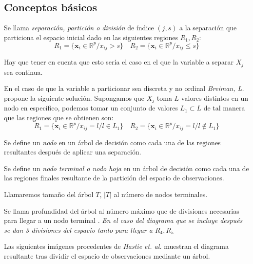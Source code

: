 \subsection*{Conceptos básicos}

\begin{defi}
Se llama \emph{separación, partición o división} de índice $(j,s)$ \cite{Hastie 2001} a la separación que particiona el espacio inicial dado en las siguientes regiones $R_1,R_2$:
\begin{equation}
R_1=\lbrace \mathbf{x}_i \in \mathbb{R}^p/ x_{ij}>s\rbrace \quad R_2=\lbrace \mathbf{x}_i \in \mathbb{R}^p/ x_{ij}\leq s\rbrace
\end{equation}

\noindent Hay que tener en cuenta que esto sería el caso en el que la variable a separar $X_j$ sea continua.

\noindent En el caso de que la variable a particionar sea discreta y no ordinal \emph{Breiman, L.}\cite{Breiman 1984} propone la siguiente solución. Supongamos que $X_j$ toma $L$ valores distintos en un nodo en específico, podemos tomar un conjunto de valores $L_1\subset L$ de tal manera que las regiones que se obtienen son:
\begin{equation}
R_1=\lbrace \mathbf{x}_i \in \mathbb{R}^p/ x_{ij}=l/ l\in L_1\rbrace \quad R_2=\lbrace \mathbf{x}_i \in \mathbb{R}^p/ x_{ij}=l/ l\notin L_1\rbrace
\end{equation}
\end{defi}
\begin{defi}
Se define un \emph{nodo} en un árbol de decisión como cada una de las regiones resultantes después de aplicar una separación.
\end{defi}
\begin{defi}
Se define un \emph{nodo terminal o nodo hoja}    \cite{Brown 2004} en un árbol de decisión como cada una de las regiones finales resultante de la partición del espacio de observaciones.
\end{defi}
\begin{defi}
Llamaremos tamaño del árbol $T$, $|T|$ al número de nodos terminales. \cite{Hastie 2001}
\end{defi}
\begin{defi}
Se llama profundidad del árbol al número máximo que de divisiones necesarias para llegar a un nodo terminal \cite{Hastie 2001}. \emph{En el caso del diagrama que se incluye después se dan 3 divisiones del espacio tanto para llegar a $R_4, R_5$}
\end{defi}
\noindent Las  siguientes imágenes procedentes de \textit{Hastie et. al.}\cite{Hastie 2001} muestran el diagrama resultante tras dividir el espacio de observaciones mediante un árbol. 

